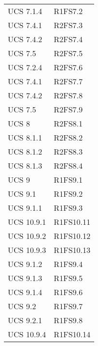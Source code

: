 {\begin{longtable}{ C{4cm} C{4cm}}
UCS 7.1.4 & R1FS7.2\\

UCS 7.4.1 & R2FS7.3\\

UCS 7.4.2 & R2FS7.4\\

UCS 7.5 & R2FS7.5\\

UCS 7.2.4 & R2FS7.6\\

UCS 7.4.1 & R2FS7.7\\

UCS 7.4.2 & R2FS7.8\\

UCS 7.5 & R2FS7.9\\

UCS 8 & R2FS8.1\\


UCS 8.1.1 & R2FS8.2\\

UCS 8.1.2 & R2FS8.3\\

UCS 8.1.3 & R2FS8.4\\

UCS 9 & R1FS9.1\\

UCS 9.1 & R1FS9.2\\


UCS 9.1.1 & R1FS9.3\\

UCS 10.9.1 & R1FS10.11\\

UCS 10.9.2 & R1FS10.12\\

UCS 10.9.3 & R1FS10.13\\

UCS 9.1.2 & R1FS9.4\\

UCS 9.1.3 & R1FS9.5\\

UCS 9.1.4 & R1FS9.6\\

UCS 9.2 & R1FS9.7\\

UCS 9.2.1 & R1FS9.8\\


UCS 10.9.4 & R1FS10.14\\


\end{longtable}}
